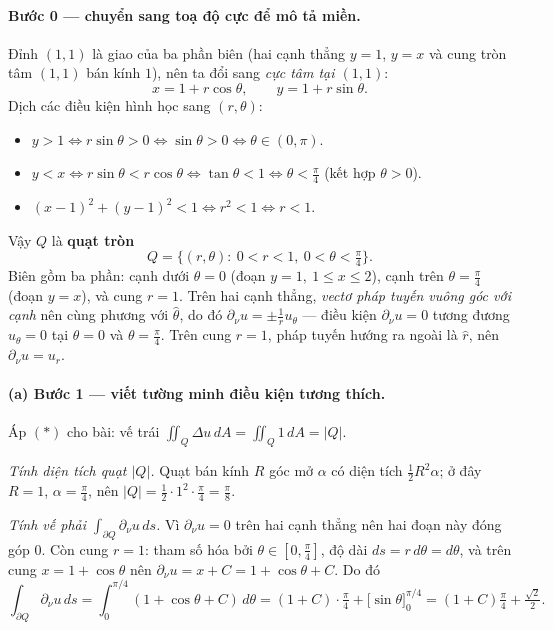 \paragraph{Bước 0 --- chuyển sang toạ độ cực để mô tả miền.}\leavevmode

Đỉnh $(1,1)$ là giao của ba phần biên (hai cạnh thẳng $y=1$, $y=x$ và cung tròn tâm $(1,1)$ bán kính $1$), nên ta đổi sang \emph{cực tâm tại $(1,1)$}:
\[
  x=1+r\cos\theta,\qquad y=1+r\sin\theta.
\]
Dịch các điều kiện hình học sang $(r,\theta)$:
\begin{itemize}
\item $y>1\iff r\sin\theta>0\iff\sin\theta>0\iff\theta\in(0,\pi)$.
\item $y<x\iff r\sin\theta<r\cos\theta\iff\tan\theta<1\iff\theta<\tfrac{\pi}{4}$ (kết hợp $\theta>0$).
\item $(x-1)^2+(y-1)^2<1\iff r^2<1\iff r<1$.
\end{itemize}
Vậy $Q$ là \textbf{quạt tròn}
\[
  Q=\big\{(r,\theta):\ 0<r<1,\ 0<\theta<\tfrac{\pi}{4}\big\}.
\]
Biên gồm ba phần: cạnh dưới $\theta=0$ (đoạn $y=1,\ 1\le x\le 2$), cạnh trên $\theta=\tfrac{\pi}{4}$ (đoạn $y=x$), và cung $r=1$. Trên hai cạnh thẳng, \emph{vectơ pháp tuyến vuông góc với cạnh} nên cùng phương với $\hat\theta$, do đó $\partial_\nu u=\pm\tfrac{1}{r}u_\theta$ --- điều kiện $\partial_\nu u=0$ tương đương $u_\theta=0$ tại $\theta=0$ và $\theta=\tfrac{\pi}{4}$. Trên cung $r=1$, pháp tuyến hướng ra ngoài là $\hat r$, nên $\partial_\nu u=u_r$.

\paragraph{(a) Bước 1 --- viết tường minh điều kiện tương thích.}\leavevmode

Áp $(\ast)$ cho bài: vế trái $\iint_Q\Delta u\,dA=\iint_Q 1\,dA=|Q|$.

\emph{Tính diện tích quạt $|Q|$.} Quạt bán kính $R$ góc mở $\alpha$ có diện tích $\tfrac12 R^2\alpha$; ở đây $R=1$, $\alpha=\tfrac{\pi}{4}$, nên $|Q|=\tfrac12\cdot1^2\cdot\tfrac{\pi}{4}=\tfrac{\pi}{8}$.

\emph{Tính vế phải $\int_{\partial Q}\partial_\nu u\,ds$.} Vì $\partial_\nu u=0$ trên hai cạnh thẳng nên hai đoạn này đóng góp $0$. Còn cung $r=1$: tham số hóa bởi $\theta\in[0,\tfrac{\pi}{4}]$, độ dài $ds=r\,d\theta=d\theta$, và trên cung $x=1+\cos\theta$ nên $\partial_\nu u=x+C=1+\cos\theta+C$. Do đó
\[
  \int_{\partial Q}\partial_\nu u\,ds=\int_0^{\pi/4}\!\!(1+\cos\theta+C)\,d\theta
  =(1+C)\cdot\tfrac{\pi}{4}+\big[\sin\theta\big]_0^{\pi/4}
  =(1+C)\tfrac{\pi}{4}+\tfrac{\sqrt2}{2}.
\]

